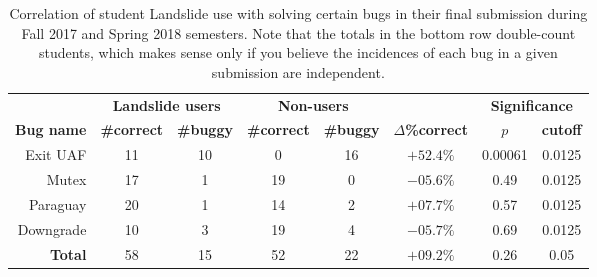 \begin{table}[t]
	\begin{center}
		\small
	\begin{tabular}{r||cc|cc|c|cc}
		& \multicolumn{2}{c|}{\bf Landslide users} & \multicolumn{2}{c|}{\bf Non-users} & & \multicolumn{2}{c}{\bf Significance} \\
		\bf Bug name & \bf \#correct & \bf \#buggy & \bf \#correct & \bf \#buggy & \bf $\Delta$\%correct & $p$ & \bf cutoff \\
		\hline
		Exit UAF  & 11	& 10	& 0	& 16	& $+52.4\%$	& 0.00061	& 0.0125 \\
		Mutex     & 17	& 1	& 19	& 0	& $-05.6\%$	& 0.49 & 0.0125 \\
		Paraguay  & 20	& 1	& 14	& 2	& $+07.7\%$	& 0.57	& 0.0125 \\
		Downgrade & 10	& 3	& 19	& 4	& $-05.7\%$	& 0.69	& 0.0125 \\ %
		\hline
		\bf Total & 58	& 15	& 52	& 22	& $+09.2\%$	& 0.26 & 0.05 \\
	\end{tabular}
	\end{center}
	\caption{
		Correlation of student Landslide use with solving certain bugs in their final submission during Fall 2017 and Spring 2018 semesters.
		Note that the totals in the bottom row double-count students,
		which makes sense only if you believe the incidences of each bug in a given submission are independent.
		}
	\label{tab:eval-common-bugs}
\end{table}

